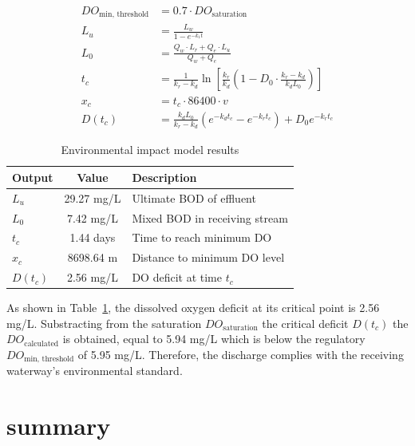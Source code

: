 \documentclass[12pt]{article}
\begin{document}
\begin{align}
DO_{\text{min, threshold}} &= 0.7 \cdot DO_{\text{saturation}} \label{eq:do_threshold} \\
L_u &= \frac{L_w}{1 - e^{-k_1 t}} \label{eq:ultimate_bod} \\
L_0 &= \frac{Q_w \cdot L_r + Q_e \cdot L_u}{Q_w + Q_e} \label{eq:mixing_zone_bod} \\
t_c &= \frac{1}{k_r - k_d} \ln \left[ \frac{k_r}{k_d} \left(1 - D_0 \cdot \frac{k_r - k_d}{k_d L_0} \right) \right] \label{eq:tc} \\
x_c &= t_c \cdot 86400 \cdot v \label{eq:distance_min_do} \\
D(t_c) &= \frac{k_d L_0}{k_r - k_d} \left(e^{-k_d t_c} - e^{-k_r t_c}\right) + D_0 e^{-k_r t_c} \label{eq:do_deficit}
\end{align}


\begin{table}[h]
\centering
\caption{Environmental impact model results}
\label{tab:env_outputs}
\begin{tabular}{|l|c|l|}
\hline
\textbf{Output} & \textbf{Value} & \textbf{Description} \\
\hline
$L_u$ & 
29.27
mg/L & Ultimate BOD of effluent \\
$L_0$ & 
7.42
mg/L & Mixed BOD in receiving stream \\
$t_c$ & 
1.44
 days & Time to reach minimum DO \\
$x_c$ & 
8698.64
m & Distance to minimum DO level \\
$D(t_c)$ & 
2.56
 mg/L & DO deficit at time $t_c$ \\
\hline
\end{tabular}
\end{table}

As shown in Table~\ref{tab:env_outputs}, 
the dissolved oxygen deficit at its critical point is 
2.56
 mg/L. Substracting from the saturation $DO_\text{saturation}$ 
 the critical deficit $D(t_c)$ the $DO_\text{calculated}$ is obtained, 
 equal to 
5.94
 mg/L
which is below the regulatory $DO_\text{min, threshold}$ of 
5.95 mg/L. Therefore, the discharge 
complies with the receiving waterway's environmental standard.

\newpage

\section{summary}
\newpage
\end{document}
